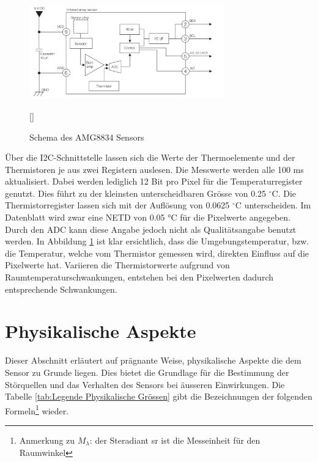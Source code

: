 \begin{figure}[H]
	\centering
	\includegraphics[width=0.75\textwidth]
	{fig/Circuit_AMG8834.PNG}
	\caption[Schema des AMG8834 Sensors]{Schema des AMG8834 Sensors} [\protect\cite{AMG8834}]
	\label{fig:SchemaAMG8834}
\end{figure}
 
Über die \ac{I2C}-Schnittstelle lassen sich die Werte der Thermoelemente und der Thermistoren je aus zwei Registern auslesen. Die Messwerte werden alle 100 ms aktualisiert. Dabei werden lediglich 12 Bit pro Pixel für die Temperaturregister genutzt. Dies führt zu der kleinsten unterscheidbaren Grösse von 0.25 $^\circ$C. Die Thermistorregister lassen sich mit der Auflösung von 0.0625 $^\circ$C unterscheiden. Im Datenblatt wird zwar eine \ac{NETD} von 0.05 °C für die Pixelwerte angegeben. Durch den \ac{ADC} kann diese Angabe jedoch nicht als Qualitätsangabe benutzt werden.
In Abbildung \ref{fig:SchemaAMG8834} ist klar ersichtlich, dass die Umgebungstemperatur, bzw. die Temperatur, welche vom Thermistor gemessen wird, direkten Einfluss auf die Pixelwerte hat. Variieren die Thermistorwerte aufgrund von Raumtemperaturschwankungen, entstehen bei den Pixelwerten dadurch entsprechende Schwankungen.

\section{Physikalische Aspekte}
\label{sec:Physik}
Dieser Abschnitt erläutert auf prägnante Weise, physikalische Aspekte die dem Sensor zu Grunde liegen. Dies bietet die Grundlage für die Bestimmung der Störquellen und das Verhalten des Sensors bei äusseren Einwirkungen. Die Tabelle \ref{tab:Legende Physikalische Grössen} gibt die Bezeichnungen der folgenden Formeln\footnote[2]{Anmerkung zu $M_{\lambda }$: der Steradiant sr ist die Messeinheit für den Raumwinkel} wieder.

